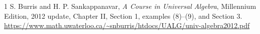 \documentclass[11pt]{article}
\begin{document}
\begin{thebibliography}{1}
S. Burris and H. P. Sankappanavar,
\emph{A Course in Universal Algebra}, Millennium Edition, 2012 update,
Chapter II, Section 1, examples (8)--(9), and Section 3.
\url{https://www.math.uwaterloo.ca/~snburris/htdocs/UALG/univ-algebra2012.pdf}
\end{thebibliography}
\end{document}
